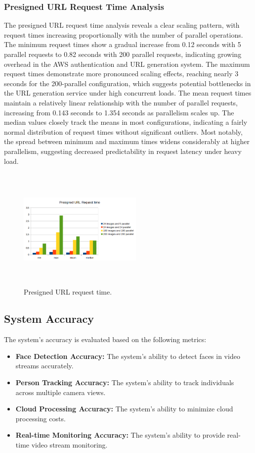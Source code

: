 \documentclass[conference]{IEEEtran}
\begin{document}
\subsubsection{Presigned URL Request Time Analysis}
The presigned URL request time analysis reveals a clear scaling pattern, with request times increasing proportionally with the number of parallel operations. The minimum request times show a gradual increase from 0.12 seconds with 5 parallel requests to 0.82 seconds with 200 parallel requests, indicating growing overhead in the AWS authentication and URL generation system. The maximum request times demonstrate more pronounced scaling effects, reaching nearly 3 seconds for the 200-parallel configuration, which suggests potential bottlenecks in the URL generation service under high concurrent loads. The mean request times maintain a relatively linear relationship with the number of parallel requests, increasing from 0.143 seconds to 1.354 seconds as parallelism scales up. The median values closely track the means in most configurations, indicating a fairly normal distribution of request times without significant outliers. Most notably, the spread between minimum and maximum times widens considerably at higher parallelism, suggesting decreased predictability in request latency under heavy load.
\begin{figure}[ht]	
	\centering
	\includegraphics[width=6cm,height=6cm,keepaspectratio]{images/measurements_cloud/presigned_url_request_time.png}
	\caption{Presigned URL request time.}
	\label{presigned-url-request-time}
\end{figure}

\subsection{System Accuracy}
The system's accuracy is evaluated based on the following metrics:
\begin{itemize}
      \item \textbf{Face Detection Accuracy:} The system's ability to detect faces in video streams accurately.
      \item \textbf{Person Tracking Accuracy:} The system's ability to track individuals across multiple camera views.
      \item \textbf{Cloud Processing Accuracy:} The system's ability to minimize cloud processing costs.
      \item \textbf{Real-time Monitoring Accuracy:} The system's ability to provide real-time video stream monitoring. 
\end{itemize}
\end{document}
